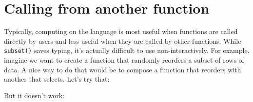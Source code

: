 \hypertarget{calling-from-another-function}{%
\section{Calling from another
function}\label{calling-from-another-function}}

Typically, computing on the language is most useful when functions are
called directly by users and less useful when they are called by other
functions. While \texttt{subset()} saves typing, it's actually difficult
to use non-interactively. For example, imagine we want to create a
function that randomly reorders a subset of rows of data. A nice way to
do that would be to compose a function that reorders with another that
selects. Let's try that: 

\begin{Shaded}
\begin{Highlighting}[]
\StringTok{ }
\StringTok{ }
\StringTok{ }\NormalTok{())}
\NormalTok{\}}

\StringTok{ }\NormalTok{(x) x[}\NormalTok{(}\NormalTok{(x)), ]}

\StringTok{ }
  \NormalTok{(}
\NormalTok{\}}
\end{Highlighting}
\end{Shaded}

But it doesn't work:

\begin{Shaded}
\begin{Highlighting}[]
\OperatorTok{>=}\StringTok{ }\NormalTok{)}
\NormalTok{()}
\end{Highlighting}
\end{Shaded}

